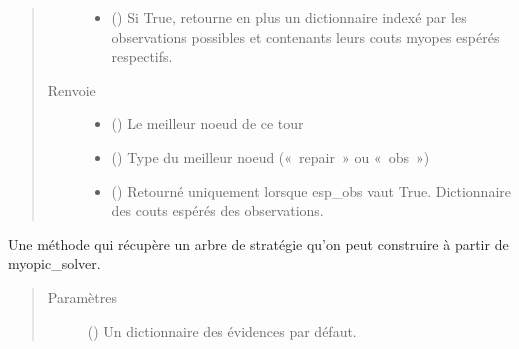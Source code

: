\documentclass[letterpaper,10pt,french]{sphinxmanual}
\begin{document}
\begin{fulllineitems}
\begin{fulllineitems}
\begin{quote}
\begin{description}
\begin{itemize}
\item {} 
 (\sphinxstyleliteralemphasis{\sphinxupquote{, }}) \textendash{} Si True, retourne en plus un dictionnaire indexé par les
observations possibles et contenants leurs couts myopes espérés
respectifs.

\end{itemize}

\item[{Renvoie}] \leavevmode
\begin{itemize}
\item {} 
 () \textendash{} Le meilleur noeud de ce tour

\item {} 
 () \textendash{} Type du meilleur noeud (« repair » ou « obs »)

\item {} 
 () \textendash{} Retourné uniquement lorsque esp\_obs vaut True. Dictionnaire des
couts espérés des observations.

\end{itemize}


\end{description}\end{quote}

\end{fulllineitems}


\begin{fulllineitems}
\label{\detokenize{index:DecisionTheoreticTroubleshooting.TroubleShootingProblem.myopic_solver_st}}
Une méthode qui récupère un arbre de stratégie qu’on peut construire à partir de myopic\_solver.
\begin{quote}\begin{description}
\item[{Paramètres}] \leavevmode
{} (\sphinxstyleliteralemphasis{\sphinxupquote{, }}) \textendash{} Un dictionnaire des évidences par défaut.


\end{description}
\end{quote}
\end{fulllineitems}
\end{fulllineitems}
\end{document}
